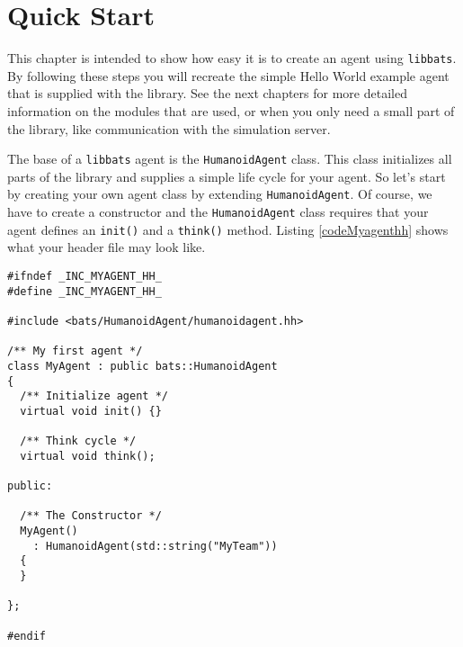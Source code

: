 \chapter{Quick Start}
\label{chQuickstart}

\lstset{numbers=left,numberstyle=\scriptsize}

This chapter is intended to show how easy it is to create an agent using {\tt libbats}. By following these steps you will recreate the simple Hello World example agent that is supplied with the library. See the next chapters for more detailed information on the modules that are used, or when you only need a small part of the library, like communication with the simulation server.

The base of a {\tt libbats} agent is the {\tt HumanoidAgent} class. This class initializes all parts of the library and supplies a simple life cycle for your agent. So let's start by creating your own agent class by extending {\tt HumanoidAgent}. Of course, we have to create a constructor and the {\tt HumanoidAgent} class requires that your agent defines an {\tt init()} and a {\tt think()} method. Listing \ref{codeMyagenthh} shows what your header file may look like.

\begin{lstlisting}[float,caption={\tt myagent.hh},label=codeMyagenthh,frame=single]
#ifndef _INC_MYAGENT_HH_
#define _INC_MYAGENT_HH_

#include <bats/HumanoidAgent/humanoidagent.hh>

/** My first agent */
class MyAgent : public bats::HumanoidAgent
{
  /** Initialize agent */
  virtual void init() {}
  
  /** Think cycle */
  virtual void think();
  
public:

  /** The Constructor */
  MyAgent()
    : HumanoidAgent(std::string("MyTeam"))
  {
  }

};

#endif
\end{lstlisting}

